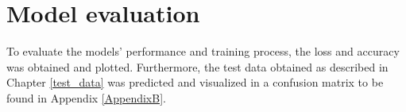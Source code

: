 

\section{Model evaluation}

To evaluate the models' performance and training process, the loss and accuracy was obtained and plotted. Furthermore, the test data obtained as described in Chapter \ref{test_data} was predicted and visualized in a confusion matrix to be found in Appendix \ref{AppendixB}.
